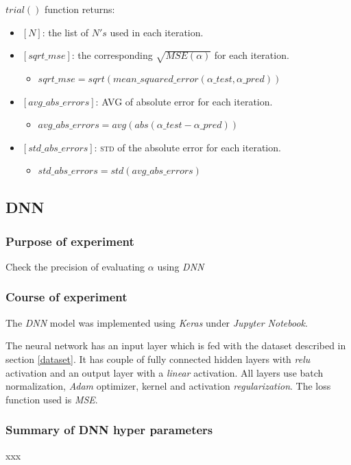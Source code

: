\documentclass[a4paper, 12pt]{report}
\begin{document}
$trial()$ function returns:
\begin{itemize}
\small
  \item $[N]$: the list of $N's$ used in each iteration.
  \item $[sqrt\_mse]$: the corresponding $\sqrt{MSE(\alpha)}$ for each iteration.
  \begin{itemize}
    \item $sqrt\_mse = sqrt(mean\_squared\_error(\alpha\_test, \alpha\_pred))$
  \end{itemize}
  \item $[avg\_abs\_errors]$: AVG of absolute error for each iteration.
  \begin{itemize}
    \item $avg\_abs\_errors = avg(abs(\alpha\_test - \alpha\_pred))$
  \end{itemize}
  \item $[std\_abs\_errors]$: \textsc{std} of the absolute error for each iteration.
  \begin{itemize}
    \item $std\_abs\_errors = std(avg\_abs\_errors)$
  \end{itemize}
\end{itemize}

\subsection{DNN}

\subsubsection{Purpose of experiment}
Check the precision of evaluating $\alpha$ using \textit{DNN}

\subsubsection{Course of experiment}
The \textit{DNN} model was implemented using \textit{Keras} under \textit{Jupyter Notebook}.

The neural network has an input layer which is fed with the dataset described in section \ref{dataset}. It has couple of fully connected hidden layers with \textit{relu} activation and an output layer with a \textit{linear} activation. All layers use batch normalization, \textit{Adam} optimizer, kernel and activation \textit{regularization}. The loss function used is \textit{\ac{MSE}}.

\subsubsection{Summary of DNN hyper parameters}
xxx
\end{document}
